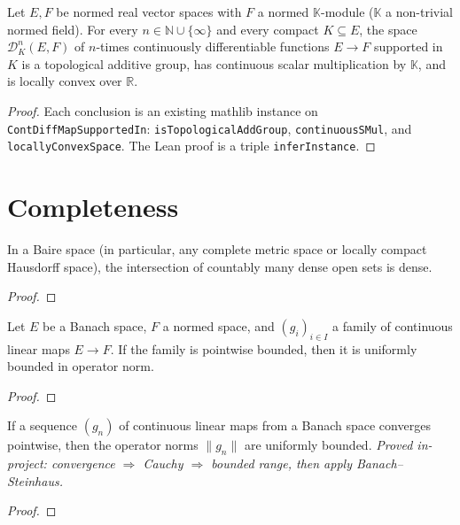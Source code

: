 \begin{theorem}
  \label{thm:DKn-LCS}
  \leanok
  Let $E, F$ be normed real vector spaces with $F$ a normed
  $\mathbb K$-module ($\mathbb K$ a non-trivial normed field). For
  every $n \in \mathbb N \cup \{\infty\}$ and every compact
  $K \subseteq E$, the space
  $\mathcal D^{n}_{K}(E, F)$ of $n$-times continuously differentiable
  functions $E \to F$ supported in $K$ is a topological additive
  group, has continuous scalar multiplication by $\mathbb K$, and is
  locally convex over $\mathbb R$.
\end{theorem}
\begin{proof}
  \leanok
  Each conclusion is an existing mathlib instance on
  \texttt{ContDiffMapSupportedIn}:
  \texttt{isTopologicalAddGroup}, \texttt{continuousSMul}, and
  \texttt{locallyConvexSpace}. The Lean proof is a triple
  \texttt{inferInstance}.
\end{proof}

\chapter{Completeness}

\begin{theorem}
  \label{thm:baire-category}
  \leanok
  In a Baire space (in particular, any complete metric space or locally
  compact Hausdorff space), the intersection of countably many dense open
  sets is dense.
\end{theorem}
\begin{proof}
  \leanok
\end{proof}

\begin{theorem}
  \label{thm:banach-steinhaus}
  \leanok
  Let $E$ be a Banach space, $F$ a normed space, and $(g_i)_{i\in I}$
  a family of continuous linear maps $E \to F$. If the family is
  pointwise bounded, then it is uniformly bounded in operator norm.
\end{theorem}
\begin{proof}
  \leanok
\end{proof}

\begin{theorem}
  \label{thm:banach-steinhaus-pointwise}
  \leanok
  If a sequence $(g_n)$ of continuous linear maps from a Banach space
  converges pointwise, then the operator norms $\|g_n\|$ are uniformly
  bounded. \emph{Proved in-project: convergence $\Rightarrow$ Cauchy
  $\Rightarrow$ bounded range, then apply Banach--Steinhaus.}
\end{theorem}
\begin{proof}
  \leanok
\end{proof}

